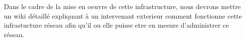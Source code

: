 Dans le cadre de la mise en oeuvre de cette infrastructure, nous devrons mettre un wiki détaillé expliquant à un intervenant exterieur comment fonctionne cette infrastucture réseau afin qu'il ou elle puisse etre en mesure d'administrer ce réseau.